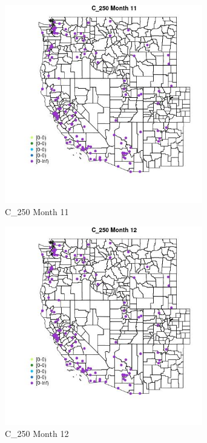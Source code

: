 \begin{figure} 
\centering  
\includegraphics[width=0.77\textwidth]{Code_Outputs/Report_ML_input_PM25_Step4_part_e_de_duplicated_aves_MapObsMo11C_250.jpg} 
\caption{\label{fig:Report_ML_input_PM25_Step4_part_e_de_duplicated_avesMapObsMo11C_250}C_250 Month 11} 
\end{figure} 
 

\begin{figure} 
\centering  
\includegraphics[width=0.77\textwidth]{Code_Outputs/Report_ML_input_PM25_Step4_part_e_de_duplicated_aves_MapObsMo12C_250.jpg} 
\caption{\label{fig:Report_ML_input_PM25_Step4_part_e_de_duplicated_avesMapObsMo12C_250}C_250 Month 12} 
\end{figure} 
 

